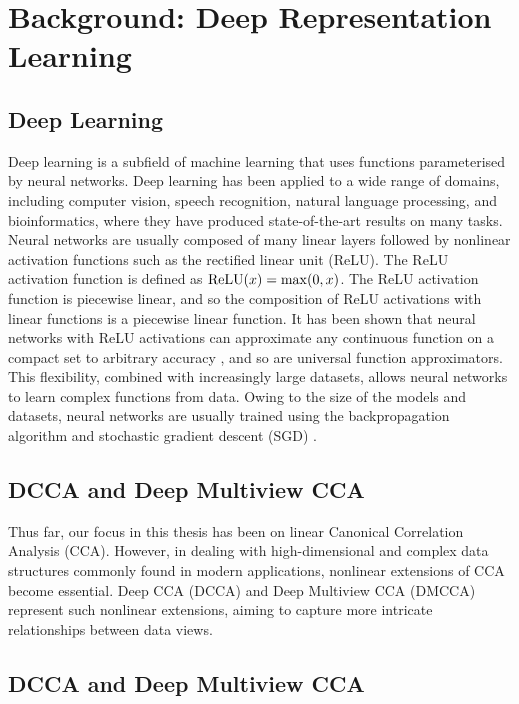 \section{Background: Deep Representation Learning}

\subsection{Deep Learning}

Deep learning is a subfield of machine learning that uses functions parameterised by neural networks.
Deep learning has been applied to a wide range of domains, including computer vision, speech recognition, natural language processing, and bioinformatics, where they have produced state-of-the-art results on many tasks.
Neural networks are usually composed of many linear layers followed by nonlinear activation functions such as the rectified linear unit (ReLU).
The ReLU activation function is defined as $\operatorname{ReLU}(x) = \max(0, x)$.
The ReLU activation function is piecewise linear, and so the composition of ReLU activations with linear functions is a piecewise linear function.
It has been shown that neural networks with ReLU activations can approximate any continuous function on a compact set to arbitrary accuracy \citep{perekrestenko2018universal}, and so are universal function approximators.
This flexibility, combined with increasingly large datasets, allows neural networks to learn complex functions from data.
Owing to the size of the models and datasets, neural networks are usually trained using the backpropagation algorithm and stochastic gradient descent (SGD) \citep{amari1993backpropagation}.

\subsection{DCCA and Deep Multiview CCA}

Thus far, our focus in this thesis has been on linear Canonical Correlation Analysis (CCA). However, in dealing with high-dimensional and complex data structures commonly found in modern applications, nonlinear extensions of CCA become essential.
Deep CCA (DCCA) and Deep Multiview CCA (DMCCA) represent such nonlinear extensions, aiming to capture more intricate relationships between data views.

\subsection{DCCA and Deep Multiview CCA}

